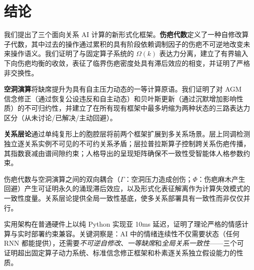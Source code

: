 \documentclass[11pt]{article}
\begin{document}
\section{结论}
\label{sec:conclusion}

我们提出了三个面向关系 AI 计算的新形式化框架。\textbf{伤疤代数}定义了一种自修改算子代数，其中过去的操作通过累积的具有阶段依赖调制因子的伤疤不可逆地改变未来操作语义。我们证明了与固定算子系统的 $\Omega(k)$ 表达力分离，建立了有界输入下向伤疤均衡的收敛，表征了临界伤疤密度处具有滞后效应的相变，并证明了严格非交换性。

\textbf{空洞演算}将缺席提升为具有自主压力动态的一等计算原语。我们证明了对 AGM 信念修正（通过恢复公设违反和自主动态）和贝叶斯更新（通过沉默增加影响性质）的不可归约性，并建立了在所有现有框架中最多坍缩为两种状态的三路表达力区分（从未讨论/已解决/主动回避）。

\textbf{关系层论}通过单纯复形上的胞腔层将前两个框架扩展到多关系场景。层上同调检测独立逐关系实例不可见的不可约关系矛盾；层拉普拉斯算子控制跨关系伤疤传播，其指数衰减由谱间隙约束；人格导出的呈现矩阵确保不一致性受智能体人格参数约束。

伤疤代数与空洞演算之间的双向耦合（$\Gamma$：空洞压力造成创伤；$\Phi$：伤疤麻木产生回避）产生可证明永久的涌现滞后效应，以及形式化表征解离作为计算失效模式的一致性度量。关系层论提供全局一致性基底，使多关系部署具有一致性而非仅仅并行。

实用架构在普通硬件上以纯 Python 实现亚 10ms 延迟，证明了理论严格的情感计算与实时部署约束兼容。关键洞察是：AI 中的情绪连续性不仅需要状态（任何 RNN 都能提供），还需要\emph{不可逆自修改}、\emph{一等缺席}和\emph{全局关系一致性}——三个可证明超出固定算子动力系统、标准信念修正框架和朴素逐关系独立假设能力的性质。


\end{document}
